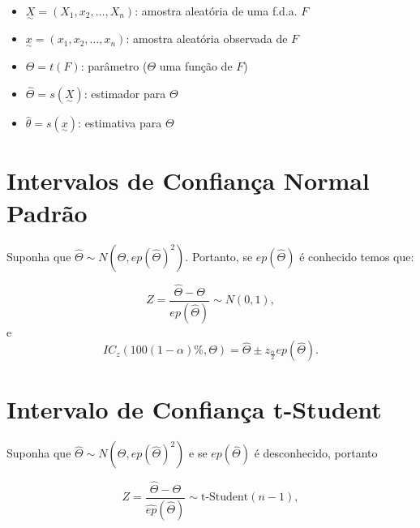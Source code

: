 \documentclass[
  letterpaper,
  DIV=11,
  numbers=noendperiod]{scrreprt}
\begin{document}
\begin{tcolorbox}[enhanced jigsaw, left=2mm, toprule=.15mm, opacityback=0, title=\textcolor{quarto-callout-warning-color}{\faExclamationTriangle}\hspace{0.5em}{Notação}, leftrule=.75mm, breakable, colbacktitle=quarto-callout-warning-color!10!white, coltitle=black, rightrule=.15mm, bottomtitle=1mm, toptitle=1mm, colframe=quarto-callout-warning-color-frame, colback=white, opacitybacktitle=0.6, bottomrule=.15mm, arc=.35mm, titlerule=0mm]

\begin{itemize}
\item
  \(\underset{\sim}{X} = (X_1, x_2, \dots, X_n)\): amostra aleatória de
  uma f.d.a. \(F\)
\item
  \(\underset{\sim}{x} = (x_1, x_2, \dots, x_n)\): amostra aleatória
  observada de \(F\)
\item
  \(\Theta=t(F)\): parâmetro (\(\Theta\) uma função de \(F\))
\item
  \(\hat{\Theta}=s(\underset{\sim}{X})\): estimador para \(\Theta\)
\item
  \(\hat{\theta}=s(\underset{\sim}{x})\): estimativa para \(\Theta\)
\end{itemize}

\end{tcolorbox}

\section{Intervalos de Confiança Normal
Padrão}\label{intervalos-de-confianuxe7a-normal-padruxe3o}

Suponha que \(\hat{\Theta}\sim N(\Theta, ep(\hat{\Theta})^2)\).
Portanto, se \(ep(\hat{\Theta})\) é conhecido temos que:

\[Z=\dfrac{\hat{\Theta} - \Theta}{ep(\hat\Theta)} \sim N(0,1),\] e
\[IC_z\left(100(1-\alpha)\%,\Theta\right)=\hat{\Theta} \pm z_{\frac{\alpha}{2}}ep(\hat{\Theta}).\]

\section{Intervalo de Confiança
t-Student}\label{intervalo-de-confianuxe7a-t-student}

Suponha que \(\hat{\Theta}\sim N(\Theta, ep(\hat{\Theta})^2)\) e se
\(ep(\hat{\Theta})\) é desconhecido, portanto

\[Z=\dfrac{\hat{\Theta} - \Theta}{\hat{ep}(\hat\Theta)} \sim \mbox{t-Student}(n-1),\]
\end{document}
